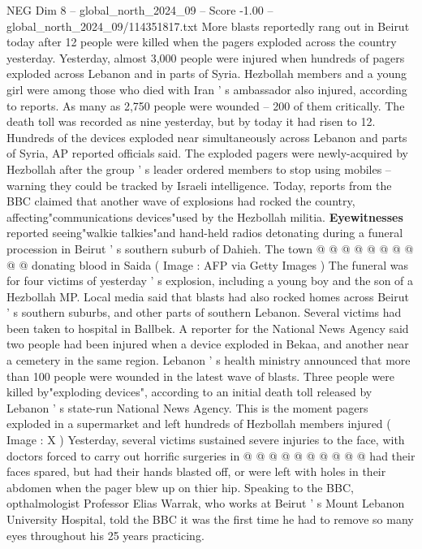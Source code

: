 \begin{textsample}{NEG Dim 8 – global\_north\_2024\_09 – Score -1.00 – global\_north\_2024\_09/114351817.txt}  \label{ex:f8_neg_372}
More blasts reportedly rang out in Beirut today after 12 people were killed when the pagers exploded across the country yesterday.
Yesterday, almost 3,000 people were injured when hundreds of pagers exploded across Lebanon and in parts of Syria.
Hezbollah members and a young girl were among those who died with Iran ' s ambassador also injured, according to reports.
As many as 2,750 people were wounded -- 200 of them critically.
The death toll was recorded as nine yesterday, but by today it had risen to 12.
Hundreds of the devices exploded near simultaneously across Lebanon and parts of Syria, AP reported officials said.
The exploded pagers were newly-acquired by Hezbollah after the group ' s leader ordered members to stop using mobiles -- warning they could be tracked by Israeli intelligence.
Today, reports from the BBC claimed that another wave of explosions had rocked the country, affecting"communications devices"used by the Hezbollah militia. \textbf{Eyewitnesses} reported seeing"walkie talkies"and hand-held radios detonating during a funeral procession in Beirut ' s southern suburb of Dahieh.
The town @ @ @ @ @ @ @ @ @ @ donating blood in Saida ( Image : AFP via Getty Images ) The funeral was for four victims of yesterday ' s explosion, including a young boy and the son of a Hezbollah MP.
Local media said that blasts had also rocked homes across Beirut ' s southern suburbs, and other parts of southern Lebanon.
Several victims had been taken to hospital in Ballbek.
A reporter for the National News Agency said two people had been injured when a device exploded in Bekaa, and another near a cemetery in the same region.
Lebanon ' s health ministry announced that more than 100 people were wounded in the latest wave of blasts.
Three people were killed by"exploding devices", according to an initial death toll released by Lebanon ' s state-run National News Agency.
This is the moment pagers exploded in a supermarket and left hundreds of Hezbollah members injured ( Image : X ) Yesterday, several victims sustained severe injuries to the face, with doctors forced to carry out horrific surgeries in @ @ @ @ @ @ @ @ @ @ had their faces spared, but had their hands blasted off, or were left with holes in their abdomen when the pager blew up on thier hip.
Speaking to the BBC, opthalmologist Professor Elias Warrak, who works at Beirut ' s Mount Lebanon University Hospital, told the BBC it was the first time he had to remove so many eyes throughout his 25 years practicing.

\end{textsample}
